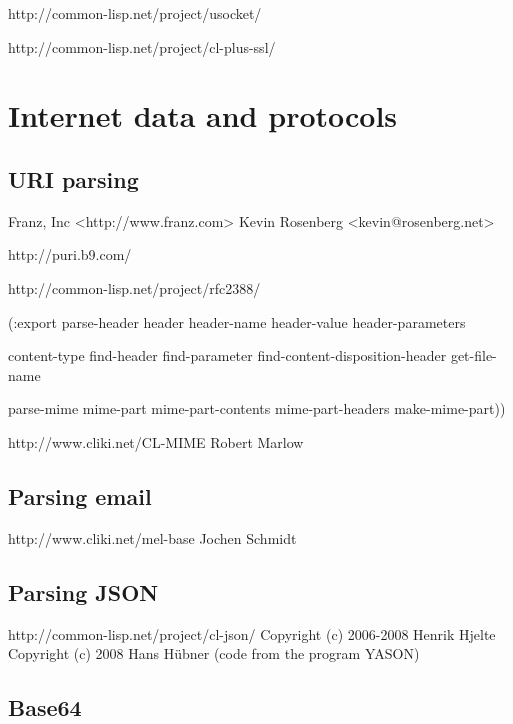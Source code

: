 \documentclass[10pt,english]{book}
\begin{document}
http://common-lisp.net/project/usocket/

http://common-lisp.net/project/cl-plus-ssl/



\chapter{Internet data and protocols}
\label{cha:intern-data-prot}

\section{URI parsing}
\label{sec:uri-parsing}

Franz, Inc <http://www.franz.com>
Kevin Rosenberg <kevin@rosenberg.net>

http://puri.b9.com/


http://common-lisp.net/project/rfc2388/

  (:export
   parse-header
   header
   header-name
   header-value
   header-parameters

   content-type
   find-header
   find-parameter
   find-content-disposition-header
   get-file-name

   parse-mime
   mime-part
   mime-part-contents
   mime-part-headers
   make-mime-part))


http://www.cliki.net/CL-MIME
Robert Marlow

\section{Parsing email}
\label{sec:parsing-email}

http://www.cliki.net/mel-base
Jochen Schmidt

\section{Parsing JSON}
\label{sec:parsing-json}

http://common-lisp.net/project/cl-json/
Copyright (c) 2006-2008 Henrik Hjelte
Copyright (c) 2008 Hans Hübner (code from the program YASON)

\section{Base64}
\label{sec:base64}
\end{document}
